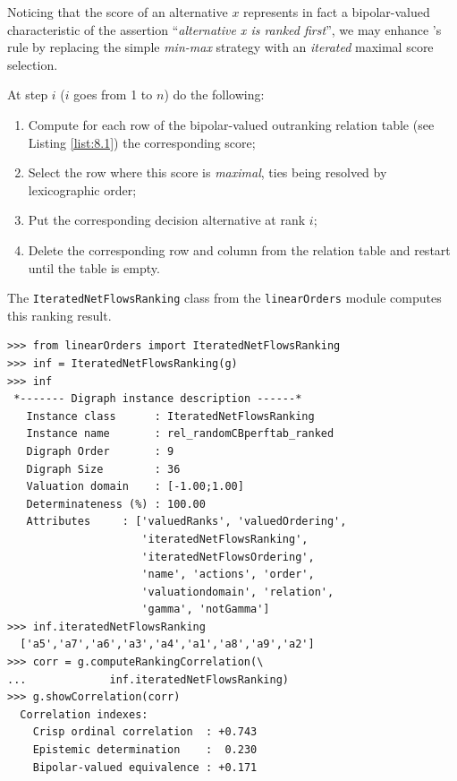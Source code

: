 Noticing that the \NetFlows score of an alternative $x$ represents in fact a bipolar-valued characteristic of the assertion ``\emph{alternative x is ranked first}'', we may enhance \Kohler 's rule by replacing the simple \emph{min-max} strategy with an \emph{iterated} maximal \NetFlows score selection.

\begin{definition}
  
\noindent At step $i$ ($i$ goes from 1 to $n$) do the following:
\begin{enumerate}
\item Compute for each row of the bipolar-valued outranking relation table (see Listing \ref{list:8.1}) the corresponding \NetFlows score;
\item Select the row where this score is \emph{maximal}, ties being resolved by lexicographic order;
\item Put the corresponding decision alternative at rank $i$;
\item Delete the corresponding row and column from the relation table and restart until the table is empty.
\end{enumerate}
\end{definition}

The \texttt{IteratedNetFlowsRanking} class from the \texttt{linearOrders} module computes this ranking result. 
\begin{lstlisting}[caption={Ranking-by-choosing with iterated maximal \NetFlows scores},label=list:8.14]   
>>> from linearOrders import IteratedNetFlowsRanking  
>>> inf = IteratedNetFlowsRanking(g)
>>> inf
 *------- Digraph instance description ------*
   Instance class      : IteratedNetFlowsRanking
   Instance name       : rel_randomCBperftab_ranked
   Digraph Order       : 9
   Digraph Size        : 36
   Valuation domain    : [-1.00;1.00]
   Determinateness (%) : 100.00
   Attributes     : ['valuedRanks', 'valuedOrdering',
                     'iteratedNetFlowsRanking',
                     'iteratedNetFlowsOrdering',
                     'name', 'actions', 'order',
                     'valuationdomain', 'relation',
                     'gamma', 'notGamma']
>>> inf.iteratedNetFlowsRanking
  ['a5','a7','a6','a3','a4','a1','a8','a9','a2']
>>> corr = g.computeRankingCorrelation(\
...             inf.iteratedNetFlowsRanking)
>>> g.showCorrelation(corr)
  Correlation indexes:
    Crisp ordinal correlation  : +0.743
    Epistemic determination    :  0.230
    Bipolar-valued equivalence : +0.171
\end{lstlisting}

